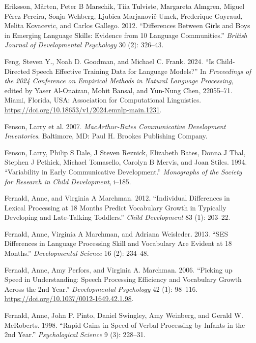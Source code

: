 \documentclass[
  11pt,
]{article}
\newlength{\cslhangindent}
\newenvironment{CSLReferences}[2] %
 {\begin{list}{}{%
  \setlength{\itemindent}{0pt}
  \setlength{\leftmargin}{0pt}
  \setlength{\parsep}{0pt}
  \ifodd #1
   \setlength{\leftmargin}{\cslhangindent}
   \setlength{\itemindent}{-1\cslhangindent}
  \fi
  \setlength{\itemsep}{#2\baselineskip}}}
 {\end{list}}
\begin{document}
\begin{CSLReferences}{1}{0}
Eriksson, Mårten, Peter B Marschik, Tiia Tulviste, Margareta Almgren,
Miguel Pérez Pereira, Sonja Wehberg, Ljubica Marjanovič-Umek, Frederique
Gayraud, Melita Kovacevic, and Carlos Gallego. 2012. {``Differences
Between Girls and Boys in Emerging Language Skills: Evidence from 10
Language Communities.''} \emph{British Journal of Developmental
Psychology} 30 (2): 326--43.

Feng, Steven Y., Noah D. Goodman, and Michael C. Frank. 2024. {``Is
Child-Directed Speech Effective Training Data for Language Models?''} In
\emph{Proceedings of the 2024 Conference on Empirical Methods in Natural
Language Processing}, edited by Yaser Al-Onaizan, Mohit Bansal, and
Yun-Nung Chen, 22055--71. Miami, Florida, USA: Association for
Computational Linguistics.
\url{https://doi.org/10.18653/v1/2024.emnlp-main.1231}.

Fenson, Larry et al. 2007. \emph{MacArthur-Bates Communicative
Development Inventories}. Baltimore, MD: Paul H. Brookes Publishing
Company.

Fenson, Larry, Philip S Dale, J Steven Reznick, Elizabeth Bates, Donna J
Thal, Stephen J Pethick, Michael Tomasello, Carolyn B Mervis, and Joan
Stiles. 1994. {``Variability in Early Communicative Development.''}
\emph{Monographs of the Society for Research in Child Development},
i--185.

Fernald, Anne, and Virginia A Marchman. 2012. {``Individual Differences
in Lexical Processing at 18 Months Predict Vocabulary Growth in
Typically Developing and Late-Talking Toddlers.''} \emph{Child
Development} 83 (1): 203--22.

Fernald, Anne, Virginia A Marchman, and Adriana Weisleder. 2013. {``SES
Differences in Language Processing Skill and Vocabulary Are Evident at
18 Months.''} \emph{Developmental Science} 16 (2): 234--48.

Fernald, Anne, Amy Perfors, and Virginia A. Marchman. 2006. {``Picking
up Speed in Understanding: Speech Processing Efficiency and Vocabulary
Growth Across the 2nd Year.''} \emph{Developmental Psychology} 42 (1):
98--116. \url{https://doi.org/10.1037/0012-1649.42.1.98}.

Fernald, Anne, John P. Pinto, Daniel Swingley, Amy Weinberg, and Gerald
W. McRoberts. 1998. {``Rapid Gains in Speed of Verbal Processing by
Infants in the 2nd Year.''} \emph{Psychological Science} 9 (3): 228--31.


\end{CSLReferences}
\end{document}
